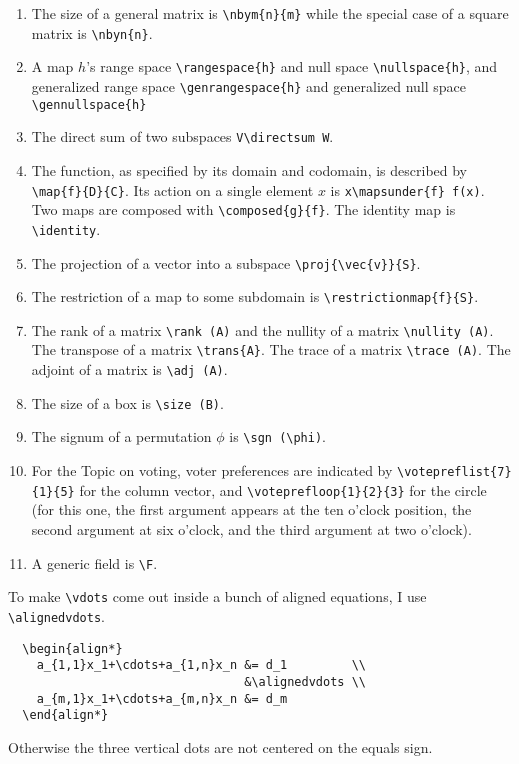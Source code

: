 \documentclass[titlepage]{article}
\begin{document}
\begin{description}
\begin{enumerate}
    \item The size of a general matrix is \verb|\nbym{n}{m}| 
      while the special case of a square matrix is \verb|\nbyn{n}|.
    \item A map $h$'s range space \verb|\rangespace{h}| 
      and null space \verb|\nullspace{h}|, 
      and generalized range space \verb|\genrangespace{h}|
      and generalized null space \verb|\gennullspace{h}|
    \item The direct sum of two subspaces \verb|V\directsum W|.
    \item The function, as specified by its domain and codomain,
      is described by \verb!\map{f}{D}{C}!.
      Its action on a single element $x$ is 
      \verb|x\mapsunder{f} f(x)|.
      Two maps are composed with \verb!\composed{g}{f}!.
      The identity map is \verb|\identity|.       
    \item The projection of a vector into a subspace
      \verb|\proj{\vec{v}}{S}|. 
    \item The restriction of a map to some subdomain is
      \verb!\restrictionmap{f}{S}!.
    \item The rank of a matrix \verb|\rank (A)| and the nullity  of a
      matrix \verb|\nullity (A)|. 
      The transpose of a matrix \verb|\trans{A}|.
      The trace of a matrix \verb|\trace (A)|.
      The adjoint of a matrix is \verb|\adj (A)|.
    \item The size of a box is \verb!\size (B)!.
    \item The signum of a permutation $\phi$ is \verb|\sgn (\phi)|.
    \item For the Topic on voting, voter preferences are indicated
      by \verb|\votepreflist{7}{1}{5}| for the column vector,
      and \verb|\voteprefloop{1}{2}{3}| for the circle (for this one,
      the first argument appears at the ten o'clock position, the second
      argument at six o'clock, and the third argument at two o'clock).
    \item A generic field is \verb!\F!.
  \end{enumerate}


\item[aligned vdots]
  To make \verb!\vdots! come out inside a bunch of aligned equations,
  I use \verb!\alignedvdots!.
\begin{verbatim}
  \begin{align*}
    a_{1,1}x_1+\cdots+a_{1,n}x_n &= d_1         \\
                                 &\alignedvdots \\
    a_{m,1}x_1+\cdots+a_{m,n}x_n &= d_m         
  \end{align*}
\end{verbatim}
  Otherwise the three vertical dots are not centered on the equals sign.


\end{description}
\end{document}
